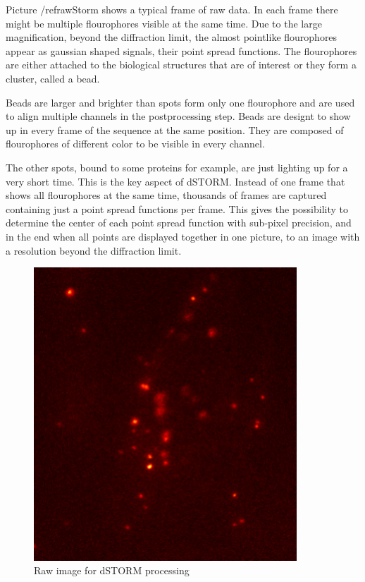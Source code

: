 Picture /ref{rawStorm} shows a typical frame of raw data. In each frame there might be multiple flourophores visible at the same time. Due to the large magnification, beyond the diffraction limit, the almost pointlike flourophores appear as gaussian shaped signals, their point spread functions. The flourophores are either attached to the biological structures that are of interest or they form a cluster, called a bead.\newline

Beads are larger and brighter than spots form only one flourophore and are used to align multiple channels in the postprocessing step. Beads are designt to show up in every frame of the sequence at the same position. They are composed of flourophores of different color to be visible in every channel.\newline

The other spots, bound to some proteins for example, are just lighting up for a very short time. This is the key aspect of dSTORM. Instead of one frame that shows all flourophores at the same time, thousands of frames are captured containing just a point spread functions per frame. This gives the possibility to determine the center of each point spread function with sub-pixel precision, and in the end when all points are displayed together in one picture, to an image with a resolution beyond the diffraction limit.

\begin{figure}
\centering
\includegraphics[width = 0.88\textwidth]{pictures/Pos2_2_red2-2frame2475Color.png}
	\caption{Raw image for dSTORM processing}
	\label{rawStorm}
\end{figure}


